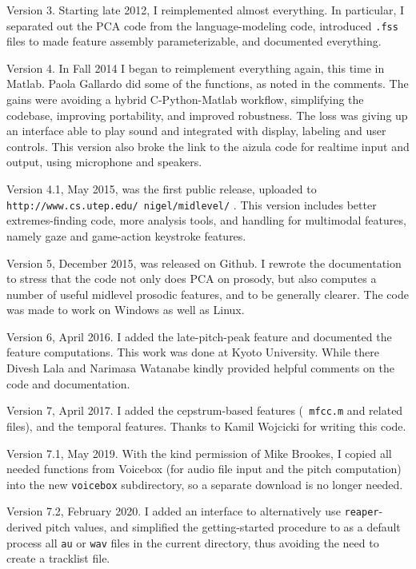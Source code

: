 \documentclass[11pt]{article}
\begin{document}
Version 3. Starting late 2012, I reimplemented almost everything.  In
particular, I separated out the PCA code from the language-modeling
code, introduced {\tt .fss} files to made feature assembly
parameterizable, and documented everything.  

Version 4.  In Fall 2014 I began to reimplement everything again, this
time in Matlab.  Paola Gallardo did some of the functions, as noted in
the comments.  The gains were avoiding a hybrid C-Python-Matlab
workflow, simplifying the codebase, improving portability, and
improved robustness.  The loss was giving up an interface able to play
sound and integrated with display, labeling and user controls.  This
version also broke the link to the aizula code for realtime input and
output, using microphone and speakers.

Version 4.1, May 2015, was the first public release, uploaded to {\tt
  http://www.cs.utep.edu/ nigel/midlevel/} .  This version includes
better extremes-finding code, more analysis tools, and handling for
multimodal features, namely gaze and game-action keystroke features.

Version 5, December 2015, was released on Github.  I rewrote the
documentation to stress that the code not only does PCA on prosody,
but also computes a number of useful midlevel prosodic features, and
to be generally clearer.  The code was made to work on Windows as well
as Linux.

Version 6, April 2016.  I added the late-pitch-peak feature and
documented the feature computations.  This work was done at Kyoto
University.  While there Divesh Lala and Narimasa Watanabe kindly
provided helpful comments on the code and documentation.

Version 7, April 2017.  I added the cepstrum-based features ({\tt
  mfcc.m} and related files), and the temporal features.  Thanks to
Kamil Wojcicki for writing this code.

Version 7.1, May 2019.  With the kind permission of Mike Brookes, I
copied all needed functions from Voicebox (for audio file input and
the pitch computation) into the new {\tt voicebox} subdirectory, so a
separate download is no longer needed.

Version 7.2, February 2020. I added an interface to alternatively use
{\tt reaper}-derived pitch values, and simplified the getting-started
procedure to as a default process all {\tt au} or {\tt wav} files in
the current directory, thus avoiding the need to create a tracklist
file.
\end{document}
